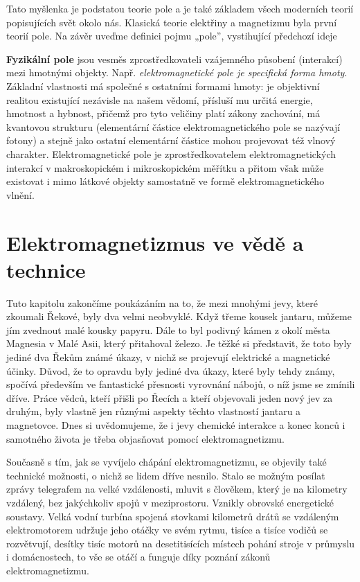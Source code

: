     Tato myšlenka je podstatou teorie pole a je také základem všech moderních teorií popisujících 
    svět okolo nás. Klasická teorie elektřiny a magnetizmu byla první teorií pole. Na závěr uveďme 
    definici pojmu „pole”, vystihující předchozí ideje
    \begin{definition}
      \textbf{Fyzikální pole} jsou vesměs zprostředkovateli vzájemného působení (interakcí) mezi 
      hmotnými objekty. Např. \emph{elektromagnetické pole je specifická forma hmoty}. Základní 
      vlastnosti má společné s ostatními formami hmoty: je objektivní realitou existující nezávisle 
      na našem vědomí, přísluší mu určitá energie, hmotnost a hybnost, přičemž pro tyto veličiny 
      platí zákony zachování, má kvantovou strukturu (elementární částice elektromagnetického pole 
      se nazývají fotony) a stejně jako ostatní elementární částice mohou projevovat též vlnový 
      charakter. Elektromagnetické pole je zprostředkovatelem elektromagnetických interakcí v 
      makroskopickém i mikroskopickém měřítku a přitom však může existovat i mimo látkové objekty 
      samostatně ve formě elektromagnetického vlnění.
    \end{definition}                 

  \section{Elektromagnetizmus ve vědě a technice}  
    \cite[s.~25]{Feynman02} Tuto kapitolu zakončíme poukázáním na to, že mezi mnohými jevy, které 
    zkoumali Řekové, byly dva velmi neobvyklé. Když třeme kousek jantaru, můžeme jím zvednout malé 
    kousky papyru. Dále to byl podivný kámen z okolí města Magnesia v Malé Asii, který přitahoval 
    železo. Je těžké si představit, že toto byly jediné dva Řekům známé úkazy, v nichž se projevují 
    elektrické a magnetické účinky. Důvod, že  to opravdu byly jediné dva úkazy, které byly tehdy 
    známy, spočívá především ve fantastické přesnosti vyrovnání nábojů, o níž jsme se zmínili 
    dříve. Práce vědců, kteří přišli po Řecích a kteří objevovali jeden nový jev za druhým, byly 
    vlastně jen různými aspekty těchto vlastností jantaru a magnetovce. Dnes si uvědomujeme, že i 
    jevy chemické interakce a konec konců i samotného života je třeba objasňovat pomocí 
    elektromagnetizmu.

    Současně s tím, jak se vyvíjelo chápání elektromagnetizmu, se objevily také technické možnosti, 
    o nichž se lidem dříve nesnilo. Stalo se možným posílat zprávy telegrafem na velké vzdálenosti, 
    mluvit s člověkem, který je na kilometry vzdálený, bez jakýchkoliv spojů v meziprostoru. 
    Vznikly obrovské energetické soustavy. Velká vodní turbína spojená stovkami kilometrů drátů se 
    vzdáleným elektromotorem udržuje jeho otáčky ve svém rytmu, tisíce a tisíce vodičů se 
    rozvětvují, desítky tisíc motorů na desetitisících místech pohání stroje v průmyslu i 
    domácnostech, to vše se otáčí a funguje díky poznání zákonů elektromagnetizmu.

